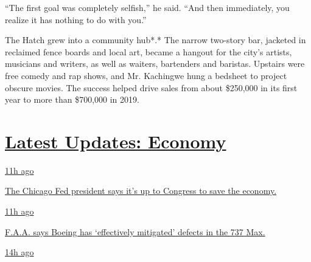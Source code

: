 ``The first goal was completely selfish,'' he said. ``And then
immediately, you realize it has nothing to do with you.''

The Hatch grew into a community hub*.* The narrow two-story bar,
jacketed in reclaimed fence boards and local art, became a hangout for
the city's artists, musicians and writers, as well as waiters,
bartenders and baristas. Upstairs were free comedy and rap shows, and
Mr. Kachingwe hung a bedsheet to project obscure movies. The success
helped drive sales from about \$250,000 in its first year to more than
\$700,000 in 2019.

\hypertarget{latest-updates-economy}{%
\section{\texorpdfstring{\href{https://www.nytimes3xbfgragh.onion/live/2020/08/03/business/stock-market-today-coronavirus?action=click\&pgtype=Article\&state=default\&region=MAIN_CONTENT_1\&context=storylines_live_updates}{Latest
Updates:
Economy}}{Latest Updates: Economy}}\label{latest-updates-economy}}

\href{https://www.nytimes3xbfgragh.onion/live/2020/08/03/business/stock-market-today-coronavirus?action=click\&pgtype=Article\&state=default\&region=MAIN_CONTENT_1\&context=storylines_live_updates\#the-chicago-fed-president-says-its-up-to-congress-to-save-the-economy}{11h
ago}

\href{https://www.nytimes3xbfgragh.onion/live/2020/08/03/business/stock-market-today-coronavirus?action=click\&pgtype=Article\&state=default\&region=MAIN_CONTENT_1\&context=storylines_live_updates\#the-chicago-fed-president-says-its-up-to-congress-to-save-the-economy}{The
Chicago Fed president says it's up to Congress to save the economy.}

\href{https://www.nytimes3xbfgragh.onion/live/2020/08/03/business/stock-market-today-coronavirus?action=click\&pgtype=Article\&state=default\&region=MAIN_CONTENT_1\&context=storylines_live_updates\#faa-says-boeing-has-effectively-mitigated-defects-in-the-737-max}{11h
ago}

\href{https://www.nytimes3xbfgragh.onion/live/2020/08/03/business/stock-market-today-coronavirus?action=click\&pgtype=Article\&state=default\&region=MAIN_CONTENT_1\&context=storylines_live_updates\#faa-says-boeing-has-effectively-mitigated-defects-in-the-737-max}{F.A.A.
says Boeing has `effectively mitigated' defects in the 737 Max.}

\href{https://www.nytimes3xbfgragh.onion/live/2020/08/03/business/stock-market-today-coronavirus?action=click\&pgtype=Article\&state=default\&region=MAIN_CONTENT_1\&context=storylines_live_updates\#small-businesses-got-emergency-loans-but-not-what-they-expected}{14h
ago}

